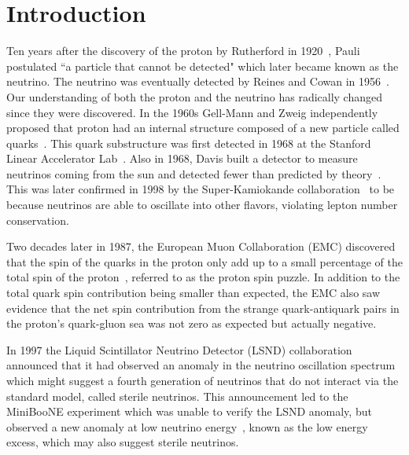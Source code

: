 \section{Introduction} \label{sec:intro}
\hspace{\parindent}

Ten years after the discovery of the proton by Rutherford in
1920~\cite{Rutherford:1920}, Pauli postulated ``a particle that cannot be
detected" which later became known as the neutrino. The neutrino was eventually
detected by Reines and Cowan in 1956~\cite{Reines:1956rs}.  Our understanding
of both the proton and the neutrino has radically changed since they were
discovered. In the 1960s Gell-Mann and Zweig independently proposed that proton
had an internal structure composed of a new particle called
quarks~\cite{GellMann:1964nj,Zweig:1981pd,Zweig:1964jf}.  This quark
substructure was first detected in 1968 at the Stanford Linear Accelerator
Lab~\cite{Friedman:1972sy}. Also in 1968, Davis built a detector to measure
neutrinos coming from the sun and detected fewer than predicted by
theory~\cite{Davis:1968cp,Bahcall:1968hc}. This was later confirmed in 1998 by
the Super-Kamiokande collaboration~\cite{Fukuda:1998mi} to be because neutrinos
are able to oscillate into other flavors, violating lepton number conservation.

Two decades later in 1987, the European Muon Collaboration (EMC) discovered
that the spin of the quarks in the proton only add up to a small percentage of
the total spin of the proton~\cite{Ashman:1987hv}, referred to as the proton spin puzzle. In
addition to the total quark spin contribution being smaller than expected, the
EMC also saw evidence that the net spin contribution from the strange
quark-antiquark pairs in the proton's quark-gluon sea was not zero as expected
but actually negative\cite{Ashman:1989ig}.

In 1997 the Liquid Scintillator Neutrino Detector (LSND) collaboration
announced that it had observed an anomaly in the neutrino oscillation
spectrum~\cite{Aguilar:2001ty} which might suggest a fourth generation of
neutrinos that do not interact via the standard model, called sterile
neutrinos. This announcement led to the MiniBooNE experiment which was unable
to verify the LSND anomaly, but observed a new anomaly at low neutrino
energy~\cite{Aguilar-Arevalo:2010wv,Aguilar-Arevalo:2018gpe}, known as the low
energy excess, which may also suggest sterile neutrinos.

